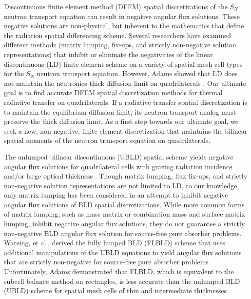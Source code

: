 \documentclass{mc2015}
\begin{document}
Discontinuous finite element method (DFEM) spatial discretizations of the $S_N$ neutron transport equation can result in negative angular flux solutions.  
These negative solutions are non-physical, but inherent to the mathematics that define the radiation spatial differencing scheme.
Several researchers have examined different methods (matrix lumping\cite{adams_dfem}, fix-ups\cite{fichtl}, and strictly non-negative solution representations\cite{csz_me}) that inhibit or eliminate the negativities of the linear discontinuous (LD) finite element scheme on  a variety of spatial mesh cell types for the $S_N$ neutron transport equation.
However, Adams showed that LD does not maintain the neutronics thick diffusion limit on quadrilaterals \cite{adams_dfem}.
Our ultimate goal is to find accurate DFEM spatial discretization methods for thermal radiative transfer on quadrilaterals.
If a radiative transfer spatial discretization is to maintain the equilibrium diffusion limit, its neutron transport analog must preserve the thick diffusion limit.
As a first step towards our ultimate goal, we seek a new, non-negative, finite element discretization that maintains the bilinear spatial moments of the neutron transport equation on quadrilaterals.

The unlumped bilinear discontinuous (UBLD) spatial scheme yields negative angular flux solutions for quadrilateral cells with grazing radiation incidence and/or large optical thickness \cite{adams_dfem}. 
Though matrix lumping, flux fix-ups, and strictly non-negative solution representations are not limited to LD, to our knowledge, only matrix lumping has been considered  in an attempt to inhibit negative angular flux solutions of BLD spatial discretizations.
While more common forms of matrix lumping, such as mass matrix or combination mass and surface matrix lumping, inhibit negative angular flux solutions, they do not guarantee a strictly non-negative BLD angular flux solution  for source-free pure absorber problems\cite{adams_dfem}.
Wareing, et al., derived the fully lumped BLD (FLBLD) scheme \cite{flbld} that uses additional manipulations of the UBLD equations to yield angular flux solutions that are strictly non-negative for source-free pure absorber problems.
Unfortunately, Adams demonstrated that FLBLD, which is equivalent to the subcell balance method on rectangles, is less accurate than the unlumped BLD (UBLD) scheme for spatial mesh cells of thin and intermediate thicknesses \cite{adams_scb}.
\end{document}
